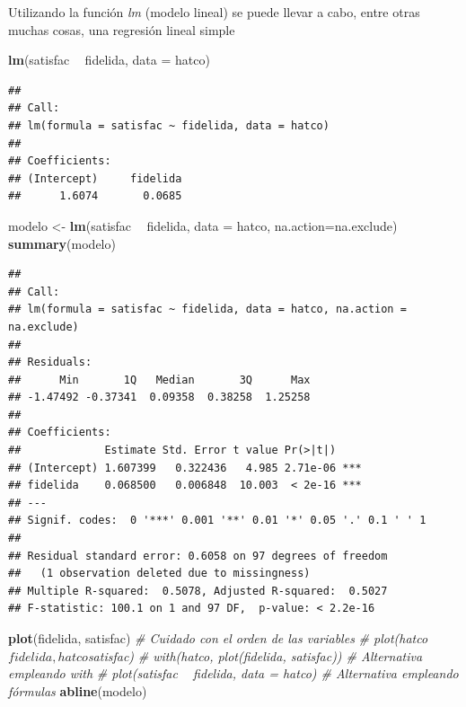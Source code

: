 \documentclass[]{book}
\newenvironment{Shaded}{\begin{snugshade}}{\end{snugshade}}
\newcommand{\KeywordTok}[1]{\textcolor[rgb]{0.13,0.29,0.53}{\textbf{#1}}}
\newcommand{\DataTypeTok}[1]{\textcolor[rgb]{0.13,0.29,0.53}{#1}}
\newcommand{\StringTok}[1]{\textcolor[rgb]{0.31,0.60,0.02}{#1}}
\newcommand{\CommentTok}[1]{\textcolor[rgb]{0.56,0.35,0.01}{\textit{#1}}}
\newcommand{\OperatorTok}[1]{\textcolor[rgb]{0.81,0.36,0.00}{\textbf{#1}}}
\newcommand{\NormalTok}[1]{#1}
\begin{document}
Utilizando la función \emph{lm} (modelo lineal) se puede llevar a cabo,
entre otras muchas cosas, una regresión lineal simple

\begin{Shaded}
\begin{Highlighting}[]
\KeywordTok{lm}\NormalTok{(satisfac }\OperatorTok{~}\StringTok{ }\NormalTok{fidelida, }\DataTypeTok{data =}\NormalTok{ hatco)}
\end{Highlighting}
\end{Shaded}

\begin{verbatim}
## 
## Call:
## lm(formula = satisfac ~ fidelida, data = hatco)
## 
## Coefficients:
## (Intercept)     fidelida  
##      1.6074       0.0685
\end{verbatim}

\begin{Shaded}
\begin{Highlighting}[]
\NormalTok{modelo <-}\StringTok{ }\KeywordTok{lm}\NormalTok{(satisfac }\OperatorTok{~}\StringTok{ }\NormalTok{fidelida, }\DataTypeTok{data =}\NormalTok{ hatco, }\DataTypeTok{na.action=}\NormalTok{na.exclude)}
\KeywordTok{summary}\NormalTok{(modelo)}
\end{Highlighting}
\end{Shaded}

\begin{verbatim}
## 
## Call:
## lm(formula = satisfac ~ fidelida, data = hatco, na.action = na.exclude)
## 
## Residuals:
##      Min       1Q   Median       3Q      Max 
## -1.47492 -0.37341  0.09358  0.38258  1.25258 
## 
## Coefficients:
##             Estimate Std. Error t value Pr(>|t|)    
## (Intercept) 1.607399   0.322436   4.985 2.71e-06 ***
## fidelida    0.068500   0.006848  10.003  < 2e-16 ***
## ---
## Signif. codes:  0 '***' 0.001 '**' 0.01 '*' 0.05 '.' 0.1 ' ' 1
## 
## Residual standard error: 0.6058 on 97 degrees of freedom
##   (1 observation deleted due to missingness)
## Multiple R-squared:  0.5078, Adjusted R-squared:  0.5027 
## F-statistic: 100.1 on 1 and 97 DF,  p-value: < 2.2e-16
\end{verbatim}

\begin{Shaded}
\begin{Highlighting}[]
\KeywordTok{plot}\NormalTok{(fidelida, satisfac)                  }\CommentTok{# Cuidado con el orden de las variables}
\CommentTok{# plot(hatco$fidelida, hatco$satisfac)    }
\CommentTok{# with(hatco, plot(fidelida, satisfac))   # Alternativa empleando with}
\CommentTok{# plot(satisfac ~ fidelida, data = hatco) # Alternativa empleando fórmulas}
\KeywordTok{abline}\NormalTok{(modelo)}
\end{Highlighting}
\end{Shaded}
\end{document}

